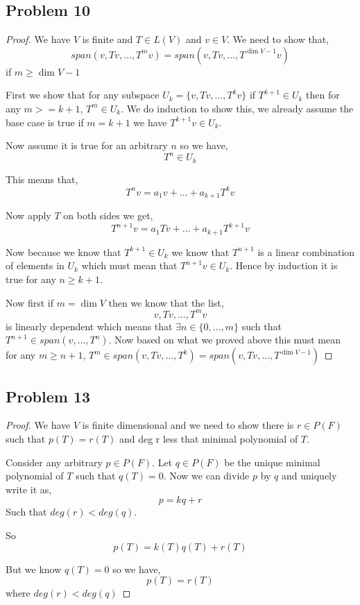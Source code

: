 \documentclass[a4paper]{report}
\begin{document}
\subsection*{Problem 10}
\begin{proof}
   We have $V$ is finite and $T \in L(V)$ and $v \in V$. We need to show that, 
$$ span(v, Tv, \dots, T^{m}v) = span(v, Tv, \dots, T^{\dim V - 1}v) $$  if $m \ge \dim V - 1$

First we show that for any subspace  $U_k = \{v, Tv, \dots, T^{k}v\}$ if  $T^{k + 1} \in U_k$ then for any $m >= k + 1$, $T^{m} \in U_k$. We do induction to show this,  we already assume the base case is true if $m = k + 1$ we have $T^{k+1}v \in U_k$.

Now assume it is true for an arbitrary $n$ so we have, 
$$ T^{n} \in U_k $$ 

This means that, 
$$ T^{n}v = a_1v + \dots + a_{k+1}T^{k}v $$ 

Now apply $T$ on both sides we get, 
$$ T^{n + 1}v = a_1Tv + \dots + a_{k + 1}T^{k + 1}v $$ 

Now because we know that $T^{k + 1} \in U_k$ we know that $T^{n + 1}$ is a linear combination of elements in $U_k$ which must mean that $T^{n + 1}v \in U_k$. Hence by induction it is true for any $n \ge k + 1$.

Now first if $m = \dim V$ then we know that the list, 
$$ v, Tv, \dots, T^{m}v $$ is linearly dependent which means that $\exists n \in \{0,\dots,m\}$ such that $T^{n + 1} \in span(v,\dots,T^{n})$. Now based on what we proved above this must mean for any $m \ge n + 1$, $T^{m} \in span(v,Tv,\dots,T^{k}) = span(v,Tv,\dots,T^{\dim V - 1})$

\end{proof}
\subsection*{Problem 13}
\begin{proof}
   We have $V$ is finite dimensional and we need to show there is $r \in P(F)$ such that $p(T) = r(T)$ and deg r less that minimal polynomial of $T$.

   Consider any arbitrary $p \in P(F)$. Let $q \in P(F)$ be the unique minimal polynomial of $T$ such that $q(T) = 0$. Now we can divide $p$ by $q$ and uniquely write it as, 
   $$ p = k q + r $$ 
   Such that $deg (r) < deg (q)$.

   So  $$p(T) = k(T)q(T) + r(T)$$

   But we know $q(T) = 0$ so we have, 
   $$ p(T) = r(T) $$  where $deg (r) < deg (q)$
\end{proof}
\end{document}
